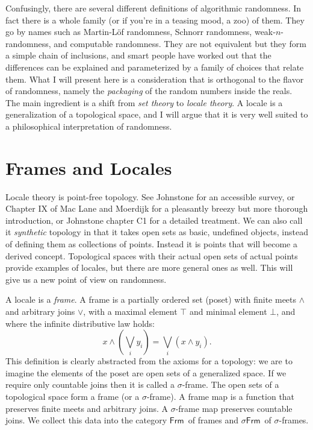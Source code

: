 \documentclass[14pt]{extarticle}
\newcommand{\bottom}{\ensuremath{\bot}}
\newcommand{\Frm}{\ensuremath{\mathsf{Frm}}}
\newcommand{\sFrm}{\ensuremath{\mathsf{\sigma Frm}}}
\begin{document}
Confusingly, there are several different definitions of algorithmic randomness. In fact there is a whole family (or if you're in a teasing mood, a zoo) of them. They go by names such as Martin-Löf randomness, Schnorr randomness, weak-$n$-randomness, and computable randomness. They are not equivalent but they form a simple chain of inclusions, and smart people have worked out that the differences can be explained and parameterized by a family of choices that relate them. What I will present here is a consideration that is orthogonal to the flavor of randomness, namely the \emph{packaging} of the random numbers inside the reals. The main ingredient is a shift from \emph{set theory} to \emph{locale theory}. A locale is a generalization of a topological space, and I will argue that it is very well suited to a philosophical interpretation of randomness.

\section{Frames and Locales}

Locale theory is point-free topology. See Johnstone \cite{johnstone1983} for an accessible survey, or Chapter IX of Mac Lane and Moerdijk \cite{maclane} for a pleasantly breezy but more thorough introduction, or Johnstone \cite{sketches} chapter C1 for a detailed treatment. We can also call it \emph{synthetic} topology in that it takes open sets as basic, undefined objects, instead of defining them as collections of points. Instead it is points that will become a derived concept. Topological spaces with their actual open sets of actual points provide examples of locales, but there are more general ones as well. This will give us a new point of view on randomness.

A locale is a \emph{frame}. A frame is a partially ordered set (poset) with finite meets $\wedge$ and arbitrary joins $\vee$, with a maximal element $\top$ and minimal element $\bottom$, and where the infinite distributive law holds: $$x \wedge (\bigvee_i y_i)=\bigvee_i (x\wedge y_i).$$ This definition is clearly abstracted from the axioms for a topology: we are to imagine the elements of the poset are open sets of a generalized space. If we require only countable joins then it is called a $\sigma$-frame. The open sets of a topological space form a frame (or a $\sigma$-frame). A frame map is a function that preserves finite meets and arbitrary joins. A $\sigma$-frame map preserves countable joins. We collect this data into the category \Frm\ of frames and \sFrm\ of $\sigma$-frames.
\end{document}
